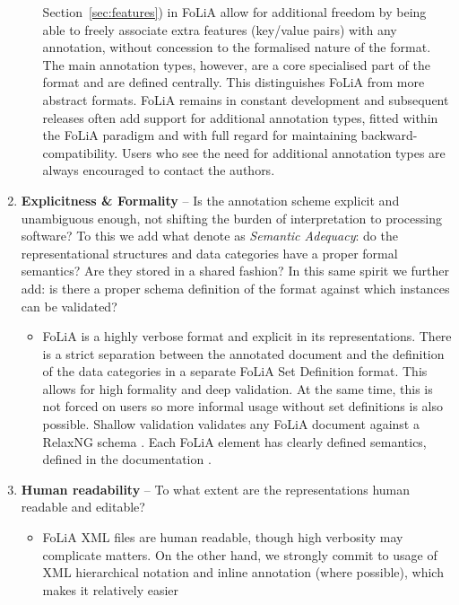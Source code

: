 \documentclass[a4paper,10pt,twoside]{article}
\begin{document}
\begin{enumerate}
\begin{itemize}
      Section~\ref{sec:features}) in FoLiA allow for additional freedom by
      being able to freely associate extra features (key/value pairs) with any
      annotation, without concession to the formalised nature of the format.
      The main annotation types, however, are a core specialised part of the format and are
      defined centrally. This distinguishes FoLiA from more abstract formats.
      FoLiA remains in constant development and subsequent releases often add
      support for additional annotation types, fitted within the FoLiA paradigm
      and with full regard for maintaining backward-compatibility. Users who
      see the need for additional annotation types are always encouraged to
      contact the authors.
  \end{itemize}
\item \textbf{Explicitness \& Formality} -- Is the annotation scheme explicit
  and unambiguous enough, not shifting the burden of interpretation to
  processing software? To this we add what  denote as
  \emph{Semantic Adequacy}: do the representational structures and data
  categories have a proper formal semantics? Are they stored in a shared
  fashion? In this same spirit we further add: is there a proper schema definition of the
  format against which instances can be validated?
  \begin{itemize}
    \item[] FoLiA is a highly verbose format and explicit in its representations.
      There is a strict separation between the annotated document and the
      definition of the data categories in a separate FoLiA Set Definition
      format. This allows for high formality and deep validation. At the same
      time, this is not forced on users so more informal usage without set
      definitions is also possible. Shallow validation validates any FoLiA
      document against a RelaxNG schema \cite{RELAXNG}. Each FoLiA element has clearly
      defined semantics, defined in the documentation \cite{FOLIA}.
  \end{itemize}
\item \textbf{Human readability} -- To what extent are the representations human readable and editable?
\begin{itemize}
    \item[] FoLiA XML files are human readable, though high verbosity may
      complicate matters. On the other hand, we strongly commit to usage of XML hierarchical notation
      and inline annotation (where possible), which makes it relatively easier

\end{itemize}
\end{enumerate}
\end{document}
